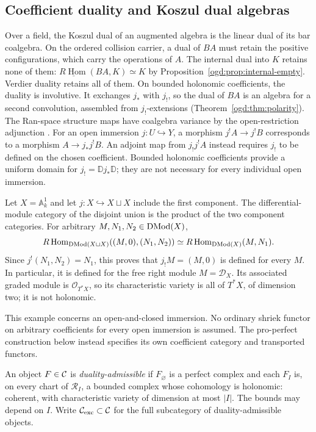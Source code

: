 \subsection{Coefficient duality and Koszul dual algebras}
\label{ogd:sec:polarity}

Over a field, the Koszul dual of an augmented algebra is the linear dual of its bar coalgebra.
On the ordered collision carrier, a dual of \(BA\) must retain the positive configurations, which carry the operations of \(A\).
The internal dual into \(K\) retains none of them: \(\underline{R\operatorname{Hom}}(BA,K)\simeq K\) by Proposition~\ref{ogd:prop:internal-empty}.
Verdier duality retains all of them.
On bounded holonomic coefficients, the duality is involutive.
It exchanges \(j_*\) with \(j_!\), so the dual of \(BA\) is an algebra
for a second convolution, assembled from \(j_!\)-extensions
(Theorem~\ref{ogd:thm:polarity}).
The Ran-space structure maps have coalgebra variance by the
open-restriction adjunction .
For an open immersion $j:U\hookrightarrow Y$, a morphism
$j^!A\to j^!B$ corresponds to a morphism $A\to j_*j^!B$.
An adjoint map from $j_!j^!A$ instead requires $j_!$ to be
defined on the chosen coefficient. Bounded holonomic coefficients
provide a uniform domain for $j_!=\mathbb D j_*\mathbb D$;
they are not necessary for every individual open immersion.

\begin{example}\label{ogd:ex:open-closed-shriek}
Let $X=\mathbb A^1_k$ and let $j:X\hookrightarrow X\sqcup X$
include the first component. The differential-module category of
the disjoint union is the product of the two component categories.
For arbitrary $M,N_1,N_2\in\operatorname{DMod}(X)$,
\[
 R\operatorname{Hom}_{\operatorname{DMod}(X\sqcup X)}
       ((M,0),(N_1,N_2))
 \simeq R\operatorname{Hom}_{\operatorname{DMod}(X)}(M,N_1).
\]
Since $j^!(N_1,N_2)=N_1$, this proves that $j_!M=(M,0)$
is defined for every $M$. In particular, it is defined for
the free right module $M=\mathcal D_X$. Its associated graded
module is $\mathcal O_{T^*X}$, so its characteristic variety
is all of $T^*X$, of dimension two; it is not holonomic.
\end{example}

This example concerns an open-and-closed immersion. No ordinary
shriek functor on arbitrary coefficients for every open immersion
is assumed. The pro-perfect construction below instead specifies
its own coefficient category and transported functors.

\begin{definition}\label{ogd:def:admissible}
An object \(F\in\mathcal C\) is \emph{duality-admissible} if \(F_\varnothing\) is a perfect complex and each \(F_I\) is, on every chart of \(\mathscr R_I\), a bounded complex whose cohomology is holonomic: coherent, with characteristic variety of dimension at most \(|I|\).
The bounds may depend on \(I\).
Write \(\mathcal C_{\mathrm{exc}}\subset\mathcal C\) for the full subcategory of duality-admissible objects.
\end{definition}

